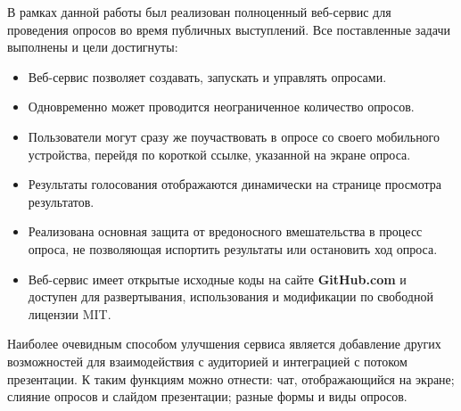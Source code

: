 \newpage
\Conc
В рамках данной работы был реализован полноценный веб-сервис для проведения опросов во время публичных выступлений. Все поставленные задачи выполнены и цели достигнуты:
\begin{itemize}
	\item Веб-сервис позволяет создавать, запускать и управлять опросами.
	\item Одновременно может проводится неограниченное количество опросов.
	\item Пользователи могут сразу же поучаствовать в опросе со своего мобильного устройства, перейдя по короткой ссылке, указанной на экране опроса.
	\item Результаты голосования отображаются динамически на странице просмотра результатов.
	\item Реализована основная защита от вредоносного вмешательства в процесс опроса, не позволяющая испортить результаты или остановить ход опроса.
	\item Веб-сервис имеет открытые исходные коды на сайте \textbf{GitHub.com} и доступен для развертывания, использования и модификации по свободной лицензии MIT. 
\end{itemize}              
Наиболее очевидным способом улучшения сервиса является добавление других возможностей для взаимодействия с аудиторией и интеграцией с потоком презентации. К таким функциям можно отнести: чат, отображающийся на экране; слияние опросов и слайдом презентации; разные формы и виды опросов.


\newpage
\printbibliography[%
    heading=bibintoc%
]

\appendix
{}



